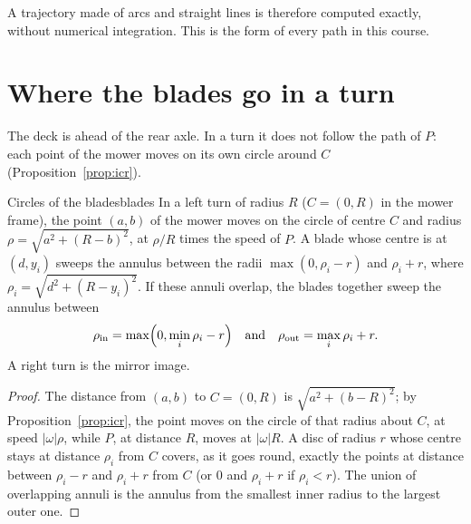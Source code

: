 A trajectory made of arcs and straight lines is therefore computed exactly,
without numerical integration. This is the form of every path in this
course.

\section{Where the blades go in a turn}

The deck is ahead of the rear axle. In a turn it does not follow the path of
$P$: each point of the mower moves on its own circle around $C$
(Proposition~\ref{prop:icr}).

\begin{proposition}{Circles of the blades}{blades}
  In a left turn of radius $R$ ($C = (0, R)$ in the mower frame), the point
  $(a, b)$ of the mower moves on the circle of centre $C$ and radius
  $\rho = \sqrt{a^2 + (R - b)^2}$, at $\rho/R$ times the speed of $P$. A
  blade whose centre is at $(d, y_i)$ sweeps the annulus between the radii
  $\max(0, \rho_i - r)$ and $\rho_i + r$, where $\rho_i = \sqrt{d^2 + (R -
  y_i)^2}$. If these annuli overlap, the blades together sweep the annulus
  between
  \[
    \rho_{\mathrm{in}} = \max\Bigl(0, \min_i \rho_i - r\Bigr)
    \quad\text{and}\quad
    \rho_{\mathrm{out}} = \max_i \rho_i + r .
  \]
  A right turn is the mirror image.
\end{proposition}

\begin{proof}
  The distance from $(a, b)$ to $C = (0, R)$ is $\sqrt{a^2 + (b - R)^2}$; by
  Proposition~\ref{prop:icr}, the point moves on the circle of that radius
  about $C$, at speed $|\omega|\rho$, while $P$, at distance $R$, moves at
  $|\omega| R$. A disc of radius $r$ whose centre stays at distance
  $\rho_i$ from $C$ covers, as it goes round, exactly the points at distance
  between $\rho_i - r$ and $\rho_i + r$ from $C$ (or $0$ and $\rho_i + r$ if
  $\rho_i < r$). The union of overlapping annuli is the annulus from the
  smallest inner radius to the largest outer one.
\end{proof}


